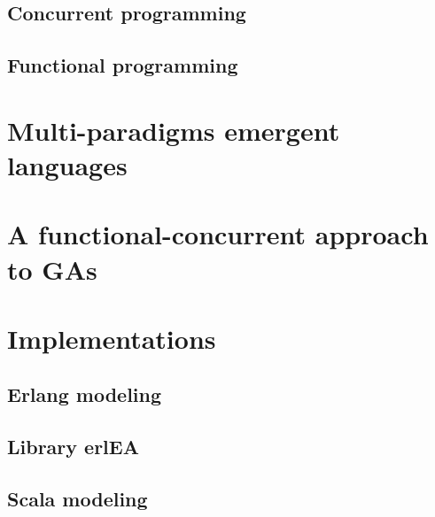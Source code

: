 \documentclass[runningheads]{llncs}
\begin{document}
\subsection{Concurrent programming}
    

\subsection{Functional programming}
    

\section{Multi-paradigms emergent languages}
\label{sec:emergentes}
    

%    
%
%    
%
%    

\section{A functional-concurrent approach to GAs}
\label{sec:design}
    

\section{Implementations}
\label{sec:impl}
    

\subsection{Erlang modeling}
    

\subsection{Library erlEA}
    

\subsection{Scala modeling}
    
\end{document}
